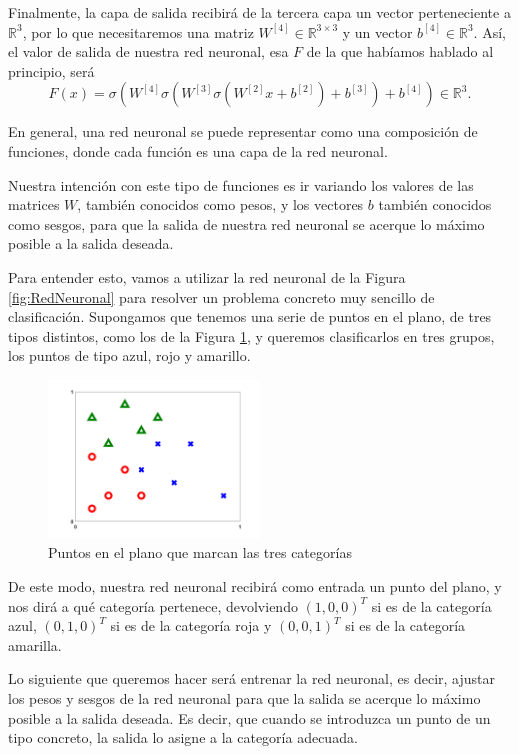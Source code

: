 \documentclass[a4paper,11pt,spanish, twoside, leqno]{tfg-uam}
\theoremstyle{definition}
\begin{document}
Finalmente, la capa de salida recibirá de la tercera capa un vector perteneciente a $\mathbb{R}^3$, por lo que necesitaremos una matriz $W^{[4]}\in\mathbb{R}^{3\times3}$ y un vector $b^{[4]}\in\mathbb{R}^3$. Así, el valor de salida de nuestra red neuronal, esa $F$ de la que habíamos hablado al principio, será
\begin{equation}
    F(x)=\sigma(W^{[4]}\sigma(W^{[3]}\sigma(W^{[2]}x+b^{[2]})+b^{[3]})+b^{[4]})\in\mathbb{R}^3.
\end{equation}\label{eq:RedNeuronal}

En general, una red neuronal se puede representar como una composición de funciones, donde cada función es una capa de la red neuronal. 

Nuestra intención con este tipo de funciones es ir variando los valores de las matrices $W$, también conocidos como pesos, y los vectores $b$ también conocidos como sesgos, para que la salida de nuestra red neuronal se acerque lo máximo posible a la salida deseada. 

Para entender esto, vamos a utilizar la red neuronal de la Figura \ref{fig:RedNeuronal} para resolver un problema concreto muy sencillo de clasificación. Supongamos que tenemos una serie de puntos en el plano, de tres tipos distintos, como los de la Figura \ref{fig:Clasificacion}, y queremos clasificarlos en tres grupos, los puntos de tipo azul, rojo y amarillo.


\begin{figure}
    \centering
    \label{fig:Clasificacion}
    \includegraphics[width=0.5\textwidth]{Figuras/pic_xy.png}
    \caption{Puntos en el plano que marcan las tres categorías}
\end{figure}

De este modo, nuestra red neuronal recibirá como entrada un punto del plano, y nos dirá a qué categoría pertenece, devolviendo $(1,0,0)^T$ si es de la categoría azul, $(0,1,0)^T$ si es de la categoría roja y $(0,0,1)^T$ si es de la categoría amarilla.

Lo siguiente que queremos hacer será entrenar la red neuronal, es decir, ajustar los pesos y sesgos de la red neuronal para que la salida se acerque lo máximo posible a la salida deseada. Es decir, que cuando se introduzca un punto de un tipo concreto, la salida lo asigne a la categoría adecuada. 
\end{document}
